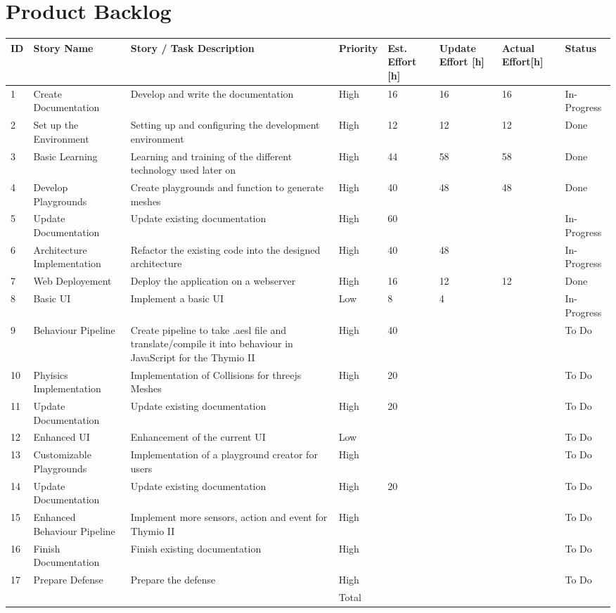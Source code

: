 \documentclass{scrbook}
\begin{document}
\chapter{Product Backlog}
\begin{longtable}{p{5mm}|p{2cm}|p{4cm}|p{1cm}|p{1cm}|p{1cm}|p{1cm}|p{15mm}}
  ID                     & Story Name & Story / Task Description & Priority & Est. Effort {[}h{]} & Update Effort {[}h{]} & Actual Effort{[}h{]} & Status                \\ \hline
  1 & Create Documentation & Develop and write the documentation & High & 16 & 16 & 16 & In-Progress \\ 
  2 & Set up the Environment & Setting up and configuring the development environment & High & 12 & 12 & 12 & Done \\ 
  3 & Basic Learning & Learning and training of the different technology used later on & High & 44 & 58 & 58 & Done \\ 
  4 & Develop Playgrounds & Create playgrounds and function to generate meshes & High & 40 & 48 & 48 & Done \\ 
  5 & Update Documentation & Update existing documentation & High & 60 &  &  & In-Progress \\
  6 & Architecture Implementation & Refactor the existing code into the designed architecture & High & 40 & 48 &  & In-Progress\\ 
  7 & Web Deployement & Deploy the application on a webserver & High & 16 & 12 & 12 & Done \\ 
  8 & Basic UI & Implement a basic UI & Low & 8 & 4 &  & In-Progress \\ 
  9 & Behaviour Pipeline & Create pipeline to take .aesl file and translate/compile it into behaviour in JavaScript for the Thymio II & High & 40 &  &  & To Do \\ 
  10 & Phyisics Implementation & Implementation of Collisions for threejs Meshes & High & 20 &  &  & To Do \\ 
  11 & Update Documentation & Update existing documentation & High & 20 &  &  & To Do \\ 
  12 & Enhanced UI & Enhancement of the current UI & Low &  &  &  & To Do \\ 
  13 & Customizable Playgrounds & Implementation of a playground creator for users & High &  &  &  & To Do \\ 
  14 & Update Documentation & Update existing documentation & High & 20 &  &  & To Do \\ 
  15 & Enhanced Behaviour Pipeline & Implement more sensors, action and event for Thymio II & High &  &  &  & To Do \\ 
  16 & Finish Documentation & Finish existing documentation & High &  &  &  & To Do \\
  17 & Prepare Defense & Prepare the defense & High &  &  &  & To Do \\ 
   &  &  & Total &  &  &  &  \\ 
\end{longtable}
\end{document}
